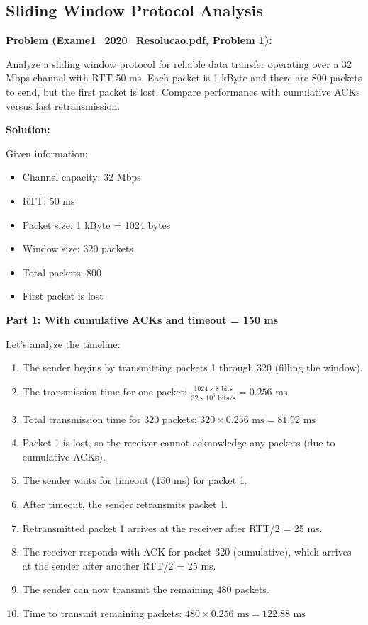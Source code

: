 \documentclass[11pt,a4paper]{article}
\begin{document}
\subsection{Sliding Window Protocol Analysis}
\textbf{Problem (Exame1\_2020\_Resolucao.pdf, Problem 1):}

Analyze a sliding window protocol for reliable data transfer operating over a 32 Mbps channel with RTT 50 ms. Each packet is 1 kByte and there are 800 packets to send, but the first packet is lost. Compare performance with cumulative ACKs versus fast retransmission.

\textbf{Solution:}

Given information:
\begin{itemize}
    \item Channel capacity: 32 Mbps
    \item RTT: 50 ms
    \item Packet size: 1 kByte = 1024 bytes
    \item Window size: 320 packets
    \item Total packets: 800
    \item First packet is lost
\end{itemize}

\textbf{Part 1: With cumulative ACKs and timeout = 150 ms}

Let's analyze the timeline:

\begin{enumerate}
    \item The sender begins by transmitting packets 1 through 320 (filling the window).
    \item The transmission time for one packet: $\frac{1024 \times 8 \text{ bits}}{32 \times 10^6 \text{ bits/s}} = 0.256 \text{ ms}$
    \item Total transmission time for 320 packets: $320 \times 0.256 \text{ ms} = 81.92 \text{ ms}$
    \item Packet 1 is lost, so the receiver cannot acknowledge any packets (due to cumulative ACKs).
    \item The sender waits for timeout (150 ms) for packet 1.
    \item After timeout, the sender retransmits packet 1.
    \item Retransmitted packet 1 arrives at the receiver after RTT/2 = 25 ms.
    \item The receiver responds with ACK for packet 320 (cumulative), which arrives at the sender after another RTT/2 = 25 ms.
    \item The sender can now transmit the remaining 480 packets.
    \item Time to transmit remaining packets: $480 \times 0.256 \text{ ms} = 122.88 \text{ ms}$
\end{enumerate}
\end{document}
